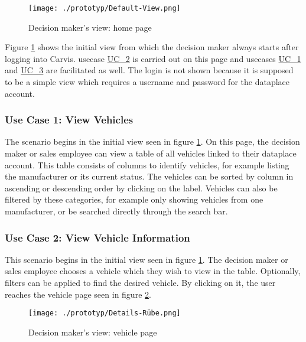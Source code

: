 \begin{figure}[H]
  \centering
  \texttt{[image: ./prototyp/Default-View.png]}
  \caption{Decision maker's view: home page}
  \label{DecisionMaker:Homepage}
\end{figure}

Figure \ref{DecisionMaker:Homepage} shows the initial view from which the decision maker always starts after logging into Carvis. \Gls{usecase} \hyperlink{Ref:UC2}{UC\_2} is carried out on this page and \glspl{usecase} \hyperlink{Ref:UC1}{UC\_1} and \hyperlink{Ref:UC3}{UC\_3} are facilitated as well. The login is not shown because it is supposed to be a simple view which requires a username and password for the \gls{dataplace} account.


\subsubsection{Use Case 1: View Vehicles}

The scenario begins in the initial view seen in figure \ref{DecisionMaker:Homepage}. On this page, the decision maker or sales employee can view a table of all vehicles linked to their \gls{dataplace} account. This table consists of columns to identify vehicles, for example listing the manufacturer or its current status. The vehicles can be sorted by column in ascending or descending order by clicking on the label. Vehicles can also be filtered by these categories, for example only showing vehicles from one manufacturer, or be searched directly through the search bar.

\subsubsection{Use Case 2: View Vehicle Information}

This scenario begins in the initial view seen in figure \ref{DecisionMaker:Homepage}. The decision maker or sales employee chooses a vehicle which they wish to view in the table. Optionally, filters can be applied to find the desired vehicle. By clicking on it, the user reaches the vehicle page seen in figure \ref{DecisionMaker:DetailsRube}.

\begin{figure}[ht]
  \centering
  \texttt{[image: ./prototyp/Details-Rübe.png]}
  \caption{Decision maker's view: vehicle page}
  \label{DecisionMaker:DetailsRube}
\end{figure}

